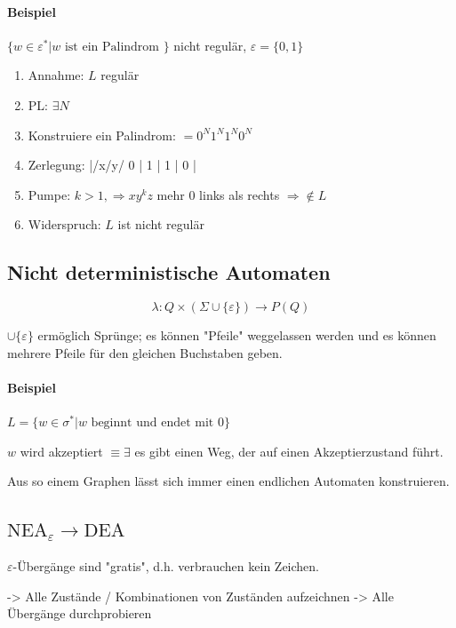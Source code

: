 \paragraph{Beispiel}
$\{w \in \varepsilon^\ast | w \text{ ist ein Palindrom }\}$ nicht regulär, $\varepsilon = \{0,1\}$

\begin{enumerate}
	\item	Annahme: $L$ regulär
	\item	PL: $\exists N$
	\item	Konstruiere ein Palindrom: $=0^N1^N1^N0^N$
	\item	Zerlegung: |/x/y/ 0 | 1  |  1 | 0 |
	\item	Pumpe: $k > 1, \Rightarrow xy^kz$ mehr $0$ links als rechts $\Rightarrow \not\in L$ \Lightning
	\item	Widerspruch: $L$ ist nicht regulär
\end{enumerate}

\subsection{Nicht deterministische Automaten}

\[
 \lambda : Q \times (\Sigma \cup \{\varepsilon\}) \rightarrow P(Q)
\]

$\cup \{\varepsilon\}$ ermöglich Sprünge; es können "Pfeile" weggelassen werden und es können mehrere Pfeile für den gleichen Buchstaben geben.

\paragraph{Beispiel} $L=\{ w \in \sigma^\ast | w \text{ beginnt und endet mit } 0\}$


$w$ wird akzeptiert $\equiv \exists$  es gibt einen Weg, der auf einen Akzeptierzustand führt.

Aus so einem Graphen lässt sich immer einen endlichen Automaten konstruieren.


\subsection{$\text{NEA}_\varepsilon \to \text{DEA}$}

$\varepsilon$-Übergänge sind "gratis", d.h. verbrauchen kein Zeichen.


-> Alle Zustände / Kombinationen von Zuständen aufzeichnen
-> Alle Übergänge durchprobieren


